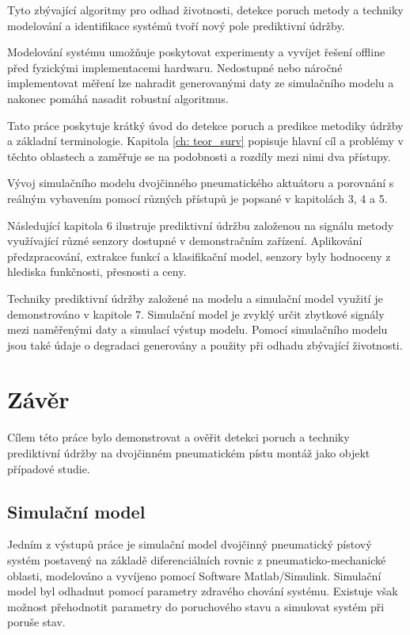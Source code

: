 Tyto zbývající algoritmy pro odhad životnosti, detekce poruch
metody a techniky modelování a identifikace systémů tvoří nový
pole prediktivní údržby.

Modelování systému umožňuje poskytovat experimenty a vyvíjet řešení
offline před fyzickými implementacemi hardwaru. Nedostupné nebo
náročné implementovat měření lze nahradit generovanými daty
ze simulačního modelu a nakonec pomáhá nasadit robustní algoritmus.

Tato práce poskytuje krátký úvod do detekce poruch a predikce
metodiky údržby a základní terminologie.
Kapitola \ref{ch: teor_surv} popisuje hlavní cíl a problémy
v těchto oblastech a zaměřuje se na podobnosti a rozdíly mezi nimi
dva přístupy.

Vývoj simulačního modelu dvojčinného pneumatického aktuátoru a
porovnání s reálným vybavením pomocí různých přístupů je
popsané v kapitolách 3, 4 a 5.

Následující kapitola 6 ilustruje prediktivní údržbu založenou na signálu
metody využívající různé senzory dostupné v demonstračním zařízení.
Aplikování předzpracování, extrakce funkcí a klasifikační model,
senzory byly hodnoceny z hlediska funkčnosti, přesnosti a ceny.

Techniky prediktivní údržby založené na modelu a simulační model
využití je demonstrováno v kapitole 7. Simulační model je zvyklý
určit zbytkové signály mezi naměřenými daty a simulací
výstup modelu. Pomocí simulačního modelu jsou také údaje o degradaci
generovány a použity při odhadu zbývající životnosti.

\section{Závěr}
Cílem této práce bylo demonstrovat a ověřit detekci poruch a
techniky prediktivní údržby na dvojčinném pneumatickém pístu
montáž jako objekt případové studie.

\subsection{Simulační model}

Jedním z výstupů práce je simulační model
dvojčinný pneumatický pístový systém postavený na základě diferenciálních rovnic
z pneumaticko-mechanické oblasti, modelováno a vyvíjeno pomocí
Software Matlab/Simulink. Simulační model byl odhadnut pomocí
parametry zdravého chování systému. Existuje však možnost
přehodnotit parametry do poruchového stavu a simulovat systém při poruše
stav.

